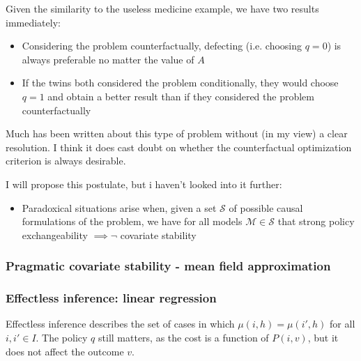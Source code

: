 Given the similarity to the useless medicine example, we have two results immediately:
\begin{itemize}
    \item Considering the problem counterfactually, defecting (i.e. choosing $q=0$) is always preferable no matter the value of $A$
    \item If the twins both considered the problem conditionally, they would choose $q=1$ and obtain a better result than if they considered the problem counterfactually
\end{itemize}
Much has been written about this type of problem without (in my view) a clear resolution. I think it does cast doubt on whether the counterfactual optimization criterion is always desirable.

I will propose this postulate, but i haven't looked into it further:
\begin{itemize}
    \item Paradoxical situations arise when, given a set $\mathscr{S}$ of possible causal formulations of the problem, we have for all models $\mathscr{M}\in\mathscr{S}$ that strong policy exchangeability $\implies \neg$ covariate stability
\end{itemize}

\subsubsection{Pragmatic covariate stability - mean field approximation}



\subsubsection{Effectless inference: linear regression}

Effectless inference describes the set of cases in which $\mu(i,h)=\mu(i',h)$ for all $i,i'\in I$. The policy $q$ still matters, as the cost is a function of $P(i,v)$, but it does not affect the outcome $v$.

\begin{center}
\end{center}

